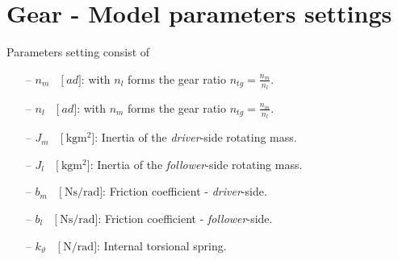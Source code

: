 \documentclass[11pt,a4paper]{article}
\numberwithin{equation}{section}
\theoremstyle{it}
\theoremstyle{definition}
\begin{document}
\section{Gear - Model parameters settings}
Parameters setting consist of
\begin{itemize}
	\item[--] $n_m\quad\Big[\SI{}{ad}\Big]$: with $n_l$ forms the gear ratio $n_{tg} = \frac{n_m}{n_l}$.
	\item[--] $n_l\quad\Big[\SI{}{ad}\Big]$: with $n_m$ forms the gear ratio $n_{tg} = \frac{n_m}{n_l}$.
	\item[--] $J_m\quad\Big[\SI{}{\kilo\gram\square\meter}\Big]$: Inertia of the \textit{driver}-side rotating mass.
	\item[--] $J_l\quad\Big[\SI{}{\kilo\gram\square\meter}\Big]$: Inertia of the \textit{follower}-side rotating mass.
	\item[--] $b_m\quad\Big[\SI{}{\newton\second\per\radian}\Big]$: Friction coefficient - \textit{driver}-side.
	\item[--] $b_l\quad\Big[\SI{}{\newton\second\per\radian}\Big]$: Friction coefficient - \textit{follower}-side.
	\item[--] $k_\vartheta\quad\Big[\SI{}{\newton\per\radian}\Big]$: Internal torsional spring.	
\end{itemize}
\end{document}
